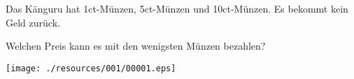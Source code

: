 Das Känguru hat 1ct-Münzen, 5ct-Münzen und 10ct-Münzen. Es bekommt kein Geld zurück.\par Welchen Preis kann es mit den wenigsten Münzen bezahlen?

\begin{center}
\texttt{[image: ./resources/001/00001.eps]}
\end{center}
